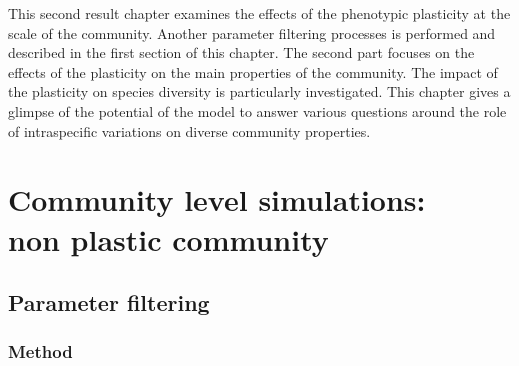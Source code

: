 
%
%

\begin{fullwidth}
This second result chapter examines the effects of the phenotypic plasticity at the scale of the community. Another parameter filtering processes is performed and described in the first section of this chapter. The second part focuses on the effects of the plasticity on the main properties of the community. The impact of the plasticity on species diversity is particularly investigated. This chapter gives a glimpse of the potential of the model to answer various questions around the role of intraspecific variations on diverse community properties.
\end{fullwidth}

\chapter{Community level simulations:\\non plastic community}


\section{Parameter filtering}
\subsection{Method}

